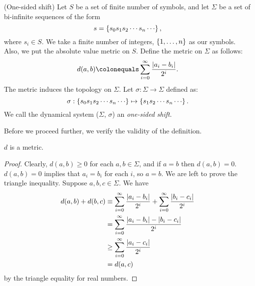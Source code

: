 \documentclass[12pt,twoside]{book}
\begin{document}
\begin{definition}
  (One-sided shift)
  Let $S$ be a set of finite number of symbols, and let $\Sigma$ be a set of bi-infinite sequences of the form
  \begin{equation*}
    s = \set{ s_0 s_1 s_2 \cdots s_n \cdots },
  \end{equation*}
  where $s_i \in S$.
  We take a finite number of integers, $\left \{ 1, \ldots, n \right \}$ as our symbols.
  Also, we put the absolute value metric on $S$.
  Define the metric on $\Sigma$ as follows:
  \begin{equation*}
    d(a,b) \ceq \sum\limits_{i = 0}^{\infty} \frac{\abs{a_i - b_i}}{2^i}.
  \end{equation*}
  The metric induces the topology on $\Sigma$.
  Let $\sigma: \Sigma \to \Sigma$ defined as:
  \begin{equation*}
    \sigma: \set{ s_0 s_1 s_2 \cdots s_n \cdots } 
    \mapsto 
    \set{ s_1 s_2 \cdots s_n \cdots }.
  \end{equation*}
  We call the dynamical system ($\Sigma$, $\sigma$) an \textit{one-sided shift}.
\end{definition}
Before we proceed further, we verify the validity of the definition.
\begin{proposition}
  $d$ is a metric.
  \label{prop:symb-metric}
  \begin{proof}
    Clearly, $d(a,b) \geq 0$ for each $a,b \in \Sigma$, and if $a = b$ then $d(a,b) = 0$.
    $d(a,b) = 0$ implies that $a_i = b_i$ for each $i$, so $a = b$.
    We are left to prove the triangle inequality.
    Suppose $a,b,c \in \Sigma$.
    We have
    \begin{align*}
      d(a,b) + d(b,c)
      &\equiv \sum\limits_{i = 0}^{\infty} \frac{\left | a_i - b_i \right |}{2^i}  +  \sum\limits_{i = 0}^{\infty} \frac{\left | b_i - c_i \right |}{2^i}  \\
      &= \sum\limits_{i = 0}^{\infty} \frac{\left | a_i - b_i \right | - \left | b_i - c_i \right |}{2^i}  \\
      &\geq \sum\limits_{i = 0}^{\infty} \frac{\left | a_i - c_i \right |}{2^i}  \\
      &= d(a,c)
    \end{align*}
    by the triangle equality for real numbers.
  \end{proof}
\end{proposition}
\end{document}
